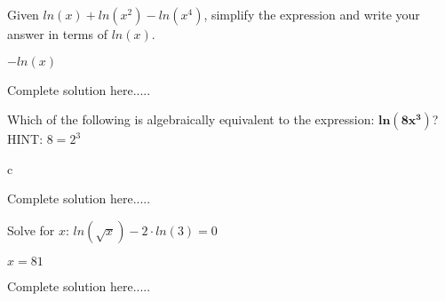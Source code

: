 \begin{example}
Given $ln(x)+ln(x^2)-ln(x^4)$, simplify the expression and write your answer in terms of $ln(x)$.
    \begin{sol}
    $-ln(x)$
    \end{sol}
    \begin{solL}
    Complete solution here.....
    
    \end{solL}
    
\end{example}
\begin{example}
Which of the following is algebraically equivalent to the expression: $\bm{ln(8x^3)}$? HINT: $8=2^3$\\
    \begin{sol}
    c
    \end{sol}
    \begin{solL}
    Complete solution here.....
    
    \end{solL}
    
\end{example}
\begin{example}
Solve for $x$: $ln(\sqrt{x})-2\cdot ln(3)=0$

    \begin{sol}
    $x=81$
    \end{sol}
    \begin{solL}
    Complete solution here.....
    
    \end{solL}
    
\end{example}
